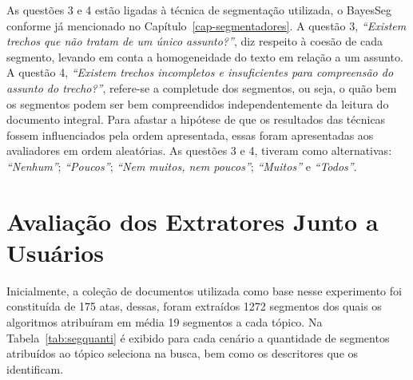 As questões 3 e 4 estão ligadas à técnica de segmentação utilizada, o BayesSeg conforme já mencionado no Capítulo~\ref{cap-segmentadores}. 
A questão 3, \textit{``Existem trechos que não tratam de um único assunto?''}, diz respeito à coesão de cada segmento, levando em conta a homogeneidade do texto em relação a um assunto. A questão 4, \textit{``Existem trechos incompletos e insuficientes para compreensão do assunto do trecho?''}, refere-se a completude dos segmentos, ou seja, o quão bem os segmentos podem ser bem compreendidos independentemente da leitura do documento integral.
Para afastar a hipótese de que os resultados das técnicas fossem influenciados pela ordem apresentada, essas foram apresentadas aos avaliadores em ordem aleatórias.
% 
As questões 3 e 4, tiveram como alternativas: 
		\textit{``Nenhum''};
		\textit{``Poucos''};
		\textit{``Nem muitos, nem poucos''};
		\textit{``Muitos''} e 
		\textit{``Todos''}.








\section{Avaliação dos Extratores Junto a Usuários}

Inicialmente, a coleção de documentos utilizada como base nesse experimento foi constituída de 175 atas, dessas, foram extraídos 1272 segmentos dos quais os algoritmos atribuíram em média 19 segmentos a cada tópico. Na Tabela~\ref{tab:segquanti} é exibido para cada cenário a quantidade de segmentos atribuídos ao tópico seleciona na busca, bem como os descritores que os identificam.
 

